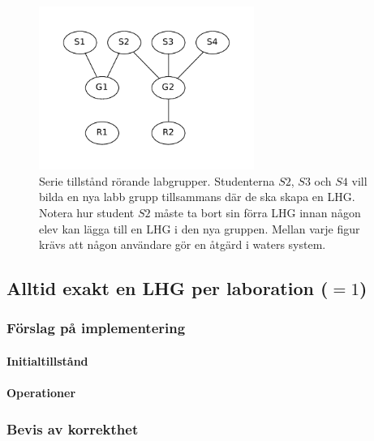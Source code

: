 \begin{figure}
  \includegraphics[width=7.0cm]{fig/labgroup/slack_add_5.pdf}        
  \caption[Serie tillstånd rörande labgrupper.]
  {Serie tillstånd rörande labgrupper. Studenterna $S2$, $S3$ och $S4$ vill
   bilda en nya labb grupp tillsammans där de ska skapa en LHG. Notera hur
   student $S2$ måste ta bort sin förra LHG innan någon elev kan lägga till en
   LHG i den nya gruppen. Mellan varje figur krävs att någon användare gör en
   åtgärd i waters system.}
  
\end{figure}

\subsection{Alltid exakt en LHG per laboration ($= 1$)}
\subsubsection{Förslag på implementering}
\paragraph{Initialtillstånd}
\paragraph{Operationer}
\subsubsection{Bevis av korrekthet}

